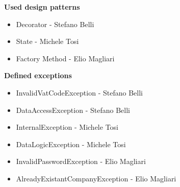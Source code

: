 \documentclass{article}
\begin{document}
\textbf{Used design patterns}

\begin{itemize}
	\item Decorator - Stefano Belli
	\item State - Michele Tosi
	\item Factory Method - Elio Magliari
\end{itemize}

\textbf{Defined exceptions}

\begin{itemize}
	\item InvalidVatCodeException - Stefano Belli
	\item DataAccessException - Stefano Belli
	\item InternalException - Michele Tosi
	\item DataLogicException - Michele Tosi
	\item InvalidPasswordException - Elio Magliari
	\item AlreadyExistantCompanyException - Elio Magliari
\end{itemize}
\end{document}
